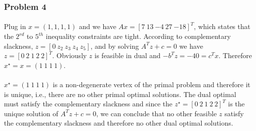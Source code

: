 \subsubsection*{Problem 4}
\paragraph{}
Plug in $x = (1, 1, 1, 1)$ and we have $Ax = [7\ 13\ {-4}\ 27\ {-18}]^T $, which states that the $2^{rd}$ to $5^{th}$ inequality constraints are tight. According to complementary slackness, $z= [0\ z_2\ z_3\ z_4\ z_5]$, and by solving $A^T z + c = 0 $ we have $z= [0\ 2\ 1\ 2\ 2]^T$. Obviously $z$ is feasible in dual and $-b^T z = {-40} = c^T x$. Therefore $x^\star =x = (1\ 1\ 1\ 1)$.
\paragraph{}
$x^\star= (1\ 1\ 1\ 1)$ is a non-degenerate vertex of the primal problem and therefore it is unique, i.e., there are no other primal optimal solutions. The dual optimal must satisfy the complementary slackness and since the $z^\star= [0\ 2\ 1\ 2\ 2]^T$ is the unique solution of $A^T z + c = 0 $, we can conclude that no other feasible $z$ satisfy the complementary slackness and therefore no other dual optimal solutions.